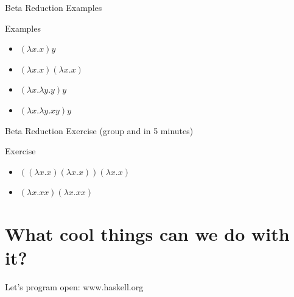 \documentclass[aspectratio=169,10pt]{beamer}
\begin{document}
\begin{frame}{Beta Reduction Examples}
  \begin{block}{Examples}
    \begin{itemize}
      \item $(\lambda x.x)y$
      \item $(\lambda x.x)(\lambda x.x)$
      \item $(\lambda x. \lambda y . y)y$
      \item $(\lambda x. \lambda y . x y)y$
    \end{itemize}
  \end{block}
\end{frame}

\begin{frame}{Beta Reduction Exercise (group and in 5 minutes)}
  \begin{block}{Exercise}
    \begin{itemize}
      \item $((\lambda x.x)(\lambda x.x))(\lambda x.x)$
      \item $(\lambda x.xx)(\lambda x.xx)$
    \end{itemize}
  \end{block}
\end{frame}

\section{What cool things can we do with it?}

\begin{frame}{Let's program}
  \huge{open: www.haskell.org}

\end{frame}
\end{document}
